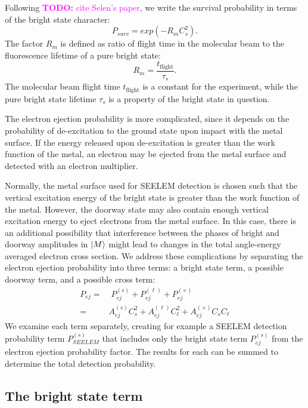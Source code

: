 \documentclass[12pt]{mitthesis}
\newcommand{\TODO} [1]{\textcolor{magenta}{\textbf{TODO:} #1}}
\begin{document}
Following \TODO{cite Selen's paper}, we write the survival probability
in terms of the bright state character:
\begin{equation}
  P_{surv} = exp \left( -R_m C_s^2 \right).
\end{equation}
The factor $R_m$ is defined as ratio of flight time in the molecular
beam to the fluorescence lifetime of a pure bright state:
\begin{equation}
  R_m = \frac{t_{\text{flight}}}{\tau_s}.
\end{equation}
The molecular beam flight time $t_{\text{flight}}$ is a constant for
the experiment, while the pure bright state lifetime $\tau_s$ is a
property of the bright state in question.

The electron ejection probability is more complicated, since it
depends on the probability of de-excitation to the ground state upon
impact with the metal surface.  If the energy released upon
de-excitation is greater than the work function of the metal, an
electron may be ejected from the metal surface and detected with an
electron multiplier.

Normally, the metal surface used for SEELEM detection is chosen such
that the vertical excitation energy of the bright state is greater
than the work function of the metal. However, the doorway state may
also contain enough vertical excitation energy to eject electrons from
the metal surface. In this case, there is an additional possibility
that interference between the phases of bright and doorway amplitudes
in $\mathinner{|{M}\rangle}$ might lead to changes in the total angle-energy averaged
electron cross section. We address these complications by separating
the electron ejection probability into three terms: a bright state
term, a possible doorway term, and a possible cross term:
\begin{equation}
  \begin{split}
    P_{ej} =& \; P_{ej}^{(s)} + P_{ej}^{(\ell)} + P_{ej}^{(\times)}\\ 
    =& A_{ej}^{(s)} C_s^2 + A_{ej}^{(\ell)} C_\ell^2 + A_{ej}^{(\times)} C_s C_\ell
  \end{split}
\end{equation}
We examine each term separately, creating for example a SEELEM
detection probability term $P_{SEELEM}^{(s)}$ that includes only the
bright state term $P_{ej}^{(s)}$ from the electron ejection
probability factor.  The results for each can be summed to determine
the total detection probability.

\subsection{The bright state term}
\label{sec:bright-state-term}
\end{document}
